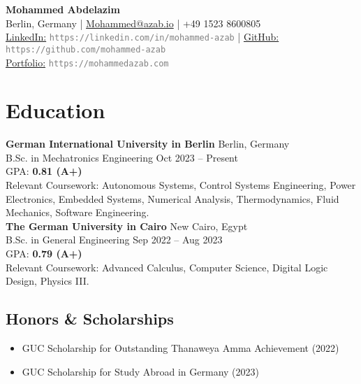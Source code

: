 \documentclass[a4paper,10pt]{article}
\newcommand{\printurl}[1]{\textcolor{gray}{\small \texttt{#1}}}
\begin{document}
\begin{center}
    {\LARGE \bfseries Mohammed Abdelazim}\\[2pt]
    Berlin, Germany \quad | \quad \href{mailto:Mohammed@azab.io}{Mohammed@azab.io} \quad | \quad +49 1523 8600805\\[6pt]
    \href{https://linkedin.com/in/mohammed-azab}{LinkedIn:} \printurl{https://linkedin.com/in/mohammed-azab} \quad | \quad
    \href{https://github.com/mohammed-azab}{GitHub:} \printurl{https://github.com/mohammed-azab} \\
    \href{https://mohammedazab.com}{Portfolio:} \printurl{https://mohammedazab.com}\\
\end{center}

\vspace{0.6em}

\section*{Education}
\textbf{German International University in Berlin} \hfill Berlin, Germany\\
B.Sc. in Mechatronics Engineering \hfill Oct 2023 -- Present\\
GPA: \textbf{0.81 (A+)}\\
Relevant Coursework: Autonomous Systems, Control Systems Engineering, Power Electronics, Embedded Systems, Numerical Analysis, Thermodynamics, Fluid Mechanics, Software Engineering.\\

\textbf{The German University in Cairo} \hfill New Cairo, Egypt\\
B.Sc. in General Engineering \hfill Sep 2022 -- Aug 2023\\
GPA: \textbf{0.79 (A+)}\\
Relevant Coursework: Advanced Calculus, Computer Science, Digital Logic Design, Physics III.\\

\subsection*{Honors \& Scholarships}
\begin{itemize}[noitemsep,topsep=0pt]
    \item GUC Scholarship for Outstanding Thanaweya Amma Achievement (2022)
    \item GUC Scholarship for Study Abroad in Germany (2023)
\end{itemize}
\end{document}
